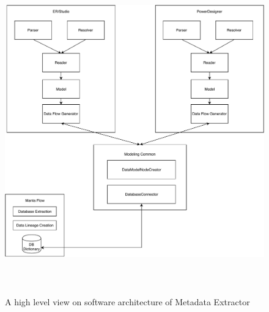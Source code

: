 \begin{figure}[H]
	\centering
	\includegraphics[height=14cm]{../img/SWArchitecture}
	\caption[Metadata Extractor Software Architecture]{A high level view on software architecture of Metadata Extractor}
	\label{SWArchitecture}
\end{figure}
